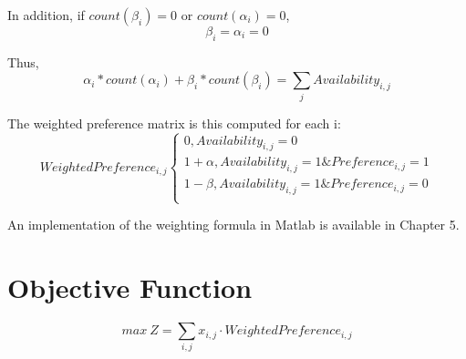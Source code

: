 In addition, if $count(\beta_{i})=0$ or $count(\alpha_{i})=0$,
$$ \beta_{i} = \alpha_{i} = 0 $$ 

Thus, 
$$ \alpha_{i}*count(\alpha_{i}) +\beta_{i} * count(\beta_{i}) = \sum\limits_{j}Availability_{i,j}$$

The weighted preference matrix is this computed for each i:
$$ WeightedPreference_{i,j} \begin{cases}
   0,  Availability_{i,j} = 0\\
   1 + \alpha,  Availability_{i,j} = 1 \& Preference_{i,j} = 1 \\
   1 - \beta, Availability_{i,j} = 1 \& Preference_{i,j} = 0\\
   
 \end{cases}$$

An implementation of the weighting formula in Matlab is available in Chapter 5.



\section{Objective Function}

$$ max~Z = \sum\limits_{i,j} x_{i,j} \cdot WeightedPreference_{i,j}$$

